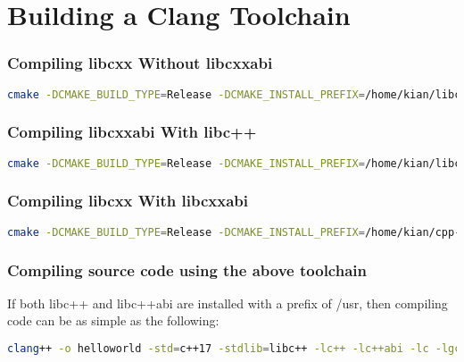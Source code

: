 \chapter{Building a Clang Toolchain}



\subsection{Compiling libcxx Without libcxxabi}
\begin{lstlisting}[language=bash]
cmake -DCMAKE_BUILD_TYPE=Release -DCMAKE_INSTALL_PREFIX=/home/kian/libc++ -DCMAKE_CXX_COMPILER=clang++ -DCMAKE_CXX_FLAGS="-std=c++17" ../libcxx
\end{lstlisting}

\subsection{Compiling libcxxabi With libc++}
\begin{lstlisting}[language=bash]
cmake -DCMAKE_BUILD_TYPE=Release -DCMAKE_INSTALL_PREFIX=/home/kian/libc++abi -DCMAKE_CXX_COMPILER=clang++ -DCMAKE_CXX_FLAGS="-std=c++17 -I/home/kian/libc++/include" -DLIBCXXABI_LIBCXX_INCLUDES=/home/kian/libc++/include/c++/v1 ../libcxxabi/
\end{lstlisting}

\subsection{Compiling libcxx With libcxxabi}
\begin{lstlisting}[language=bash]
cmake -DCMAKE_BUILD_TYPE=Release -DCMAKE_INSTALL_PREFIX=/home/kian/cpp-toolchain/libc++ -DCMAKE_CXX_COMPILER=clang++ -DCMAKE_CXX_FLAGS="-std=c++17" -DLIBCXX_CXX_ABI=libcxxabi -DLIBCXX_CXX_ABI_LIBRARY_PATH=/home/kian/libc++abi/lib -DLIBCXX_CXX_ABI_INCLUDE_PATHS=../libcxxabi/include ../libcxx
\end{lstlisting}

\subsection{Compiling source code using the above toolchain}
If both libc++ and libc++abi are installed with a prefix of /usr, then compiling code can be as simple as the following:

\begin{lstlisting}[language=bash]
clang++ -o helloworld -std=c++17 -stdlib=libc++ -lc++ -lc++abi -lc -lgcc_s main.cpp
\end{lstlisting}

